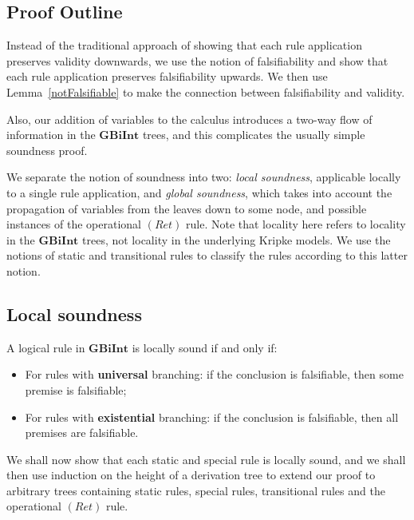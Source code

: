 \documentclass{llncs}
\numberwithin{equation}{section}
\newcommand{\GBiInt}{\mathbf{GBiInt}}
\newcommand{\ReturnRule}{(Ret)}
\begin{document}
\subsection{Proof Outline}

Instead of the traditional approach of showing that each rule application preserves validity downwards, we use the notion of falsifiability and show that each rule application preserves falsifiability upwards. We then use Lemma~\ref{notFalsifiable} to make the connection between falsifiability and validity.

Also, our addition of variables to the calculus introduces a two-way flow of information in the $\GBiInt$ trees, and this complicates the usually simple soundness proof.

We separate the notion of soundness into two: \textit{local soundness}, applicable locally to a single rule application, and \textit{global soundness}, which takes into account the propagation of variables from the leaves down to some node, and possible instances of the operational $\ReturnRule$ rule. Note that locality here refers to locality in the $\GBiInt$ trees, not locality in the underlying Kripke models. We use the notions of static and transitional rules to classify the rules according to this latter notion.

\subsection{Local soundness}

\begin{definition}
A logical rule in $\GBiInt$ is locally sound if and only if:
\begin{itemize}
	\item For rules with \textbf{universal} branching: if the conclusion is falsifiable, then some premise is falsifiable;
	\item For rules with \textbf{existential} branching: if the conclusion is falsifiable, then all premises are falsifiable.
\end{itemize}
\end{definition}

We shall now show that each static and special rule is locally sound, and we shall then use induction on the height of a derivation tree to extend our proof to arbitrary trees containing static rules, special rules, transitional rules and the operational $\ReturnRule$ rule.
\end{document}
